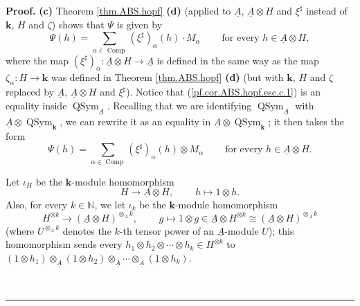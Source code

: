 \documentclass
[numbers=enddot,12pt,final,onecolumn,notitlepage,abstracton]{scrartcl}%
\theoremstyle{definition}
\newenvironment{proof}[1][Proof]{\noindent\textbf{#1.} }{\ \rule{0.5em}{0.5em}}
\let\sumnonlimits\sum
\renewcommand{\sum}{\sumnonlimits\limits}
\begin{document}
\begin{proof}
\textbf{(c)} Theorem \ref{thm.ABS.hopf} \textbf{(d)} (applied to
$\underline{A}$, $\underline{A}\otimes H$ and $\xi^{\sharp}$ instead of
$\mathbf{k}$, $H$ and $\zeta$) shows that $\Psi$ is given by%
\begin{equation}
\Psi\left(  h\right)  =\sum_{\alpha\in\operatorname*{Comp}}\left(  \xi
^{\sharp}\right)  _{\alpha}\left(  h\right)  \cdot M_{\alpha}%
\ \ \ \ \ \ \ \ \ \ \text{for every }h\in\underline{A}\otimes H,
\label{pf.cor.ABS.hopf.esc.c.1}%
\end{equation}
where the map $\left(  \xi^{\sharp}\right)  _{\alpha}:\underline{A}\otimes
H\rightarrow\underline{A}$ is defined in the same way as the map
$\zeta_{\alpha}:H\rightarrow\mathbf{k}$ was defined in Theorem
\ref{thm.ABS.hopf} \textbf{(d)} (but with $\mathbf{k}$, $H$ and $\zeta$
replaced by $\underline{A}$, $\underline{A}\otimes H$ and $\xi^{\sharp}$).
Notice that (\ref{pf.cor.ABS.hopf.esc.c.1}) is an equality inside
$\operatorname*{QSym}\nolimits_{\underline{A}}$. Recalling that we are
identifying $\operatorname*{QSym}\nolimits_{\underline{A}}$ with
$\underline{A}\otimes\operatorname*{QSym}\nolimits_{\mathbf{k}}$, we can
rewrite it as an equality in $\underline{A}\otimes\operatorname*{QSym}%
\nolimits_{\mathbf{k}}$; it then takes the form%
\begin{equation}
\Psi\left(  h\right)  =\sum_{\alpha\in\operatorname*{Comp}}\left(  \xi
^{\sharp}\right)  _{\alpha}\left(  h\right)  \otimes M_{\alpha}%
\ \ \ \ \ \ \ \ \ \ \text{for every }h\in\underline{A}\otimes H.
\label{pf.cor.ABS.hopf.esc.c.2}%
\end{equation}


Let $\iota_{H}$ be the $\mathbf{k}$-module homomorphism%
\[
H\rightarrow\underline{A}\otimes H,\ \ \ \ \ \ \ \ \ \ h\mapsto1\otimes h.
\]
Also, for every $k\in\mathbb{N}$, we let $\iota_{k}$ be the $\mathbf{k}%
$-module homomorphism%
\[
H^{\otimes k}\rightarrow\left(  \underline{A}\otimes H\right)  ^{\otimes
_{\underline{A}}k},\ \ \ \ \ \ \ \ \ \ g\mapsto1\otimes g\in\underline{A}%
\otimes H^{\otimes k}\cong\left(  \underline{A}\otimes H\right)
^{\otimes_{\underline{A}}k}%
\]
(where $U^{\otimes_{\underline{A}}k}$ denotes the $k$-th tensor power of an
$\underline{A}$-module $U$); this homomorphism sends every $h_{1}\otimes
h_{2}\otimes\cdots\otimes h_{k}\in H^{\otimes k}$ to $\left(  1\otimes
h_{1}\right)  \otimes_{\underline{A}}\left(  1\otimes h_{2}\right)
\otimes_{\underline{A}}\cdots\otimes_{\underline{A}}\left(  1\otimes
h_{k}\right)  $.


\end{proof}
\end{document}
